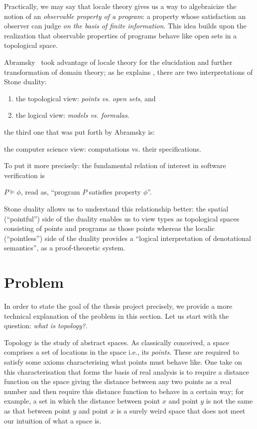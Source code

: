 \documentclass{article}
\begin{document}
Practically, we may say that locale theory gives us a way to algebraicize the notion of an
\emph{observable property of a program}: a property whose satisfaction an observer can
judge \emph{on the basis of finite information}. This idea builds upon the realization
that observable properties of programs behave like open sets in a topological space.

Abramsky~\cite{abramsky:1991} took advantage of locale theory for the elucidation and
further transformation of domain theory; as he explains \cite{abramsky:1991}, there are
two interpretations of Stone duality:
\begin{enumerate}
  \item the topological view: \emph{points vs. open sets}, and
  \item the logical view: \emph{models vs. formulas}.
\end{enumerate}
the third one that was put forth by Abramsky is:
\begin{center}
  the computer science view: computations vs. their specifications.
\end{center}

To put it more precisely: the fundamental relation of interest in software verification is

\begin{center}
  $P \vDash \phi$, \qquad read as, \qquad ``program $P$ satisfies property $\phi$''.
\end{center}

Stone duality allows us to understand this relationship better: the spatial (``pointful'')
side of the duality enables us to view types as topological spaces consisting of points
and programs as those points whereas the localic (``pointless'') side of the duality
provides a ``logical interpretation of denotational semantics'', as a proof-theoretic
system.

\section{Problem}

In order to state the goal of the thesis project precisely, we provide a more technical
explanation of the problem in this section. Let us start with the question:
\emph{what is topology?}.

Topology is the study of abstract spaces. As classically conceived, a space comprises a
set of locations in the space i.e., its \emph{points}. These are required to satisfy some
axioms characterising what points must behave like. One take on this characterisation that
forms the basis of real analysis is to require a distance function on the space giving the
distance between any two points as a real number and then require this distance function
to behave in a certain way; for example, a set in which the distance between point $x$ and
point $y$ is not the same as that between point $y$ and point $x$ is a surely weird space
that does not meet our intuition of what a space is.
\end{document}
